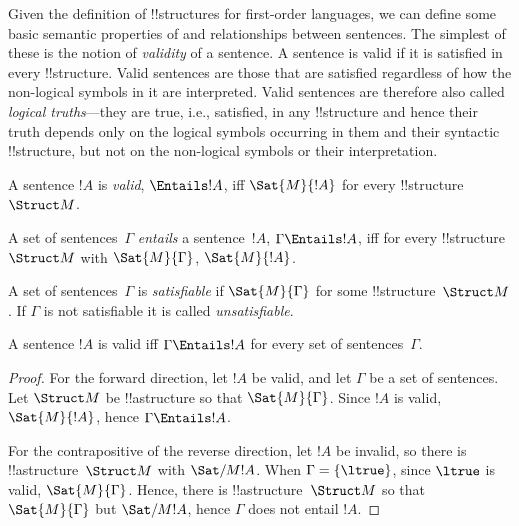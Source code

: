 \documentclass[../../../include/open-logic-section]{subfiles}
\begin{document}

\begin{explain}
Given the definition of !!{structure}s for first-order languages, we can
define some basic semantic properties of and relationships between
sentences.  The simplest of these is the notion of \emph{validity} of
a sentence.  A sentence is valid if it is satisfied in every
!!{structure}.  Valid sentences are those that are satisfied regardless of
how the non-logical symbols in it are interpreted.  Valid sentences
are therefore also called \emph{logical truths}---they are true, i.e.,
satisfied, in any !!{structure} and hence their truth depends only on the
logical symbols occurring in them and their syntactic !!{structure}, but not
on the non-logical symbols or their interpretation.
\end{explain}

\begin{defn}[Validity]
A sentence $!A$ is \emph{valid}, $\Entails !A$, iff $\Sat{M}{!A}$ for every
!!{structure}~$\Struct M$.
\end{defn}

\begin{defn}[Entailment]
A set of sentences~$\Gamma$ \emph{entails} a sentence~$!A$, $\Gamma
\Entails !A$, iff for every !!{structure}~$\Struct M$ with
$\Sat{M}{\Gamma}$, $\Sat{M}{!A}$.
\end{defn}


\begin{defn}[Satisfiability]
A set of sentences~$\Gamma$ is \emph{satisfiable} if $\Sat{M}{\Gamma}$
for some !!{structure}~$\Struct M$.  If $\Gamma$ is not satisfiable it is
called \emph{unsatisfiable}.
\end{defn}

\begin{prop}
A sentence $!A$ is valid iff $\Gamma \Entails !A$ for every set of
sentences~$\Gamma$.
\end{prop}

\begin{proof}
For the forward direction, let $!A$ be valid, and let $\Gamma$ be a
set of sentences. Let $\Struct M$ be !!a{structure} so that
$\Sat{M}{\Gamma}$. Since $!A$ is valid, $\Sat{M}{!A}$, hence $\Gamma
\Entails !A$.

For the contrapositive of the reverse direction, let $!A$ be invalid,
so there is !!a{structure}~$\Struct M$ with $\Sat/{M}{!A}$. When $\Gamma
= \{ \ltrue \}$, since $\ltrue$ is valid, $\Sat{M}{\Gamma}$. Hence,
there is !!a{structure}~$\Struct M$ so that $\Sat{M}{\Gamma}$ but
$\Sat/{M}{!A}$, hence $\Gamma$ does not entail $!A$.
\end{proof}
\end{document}
